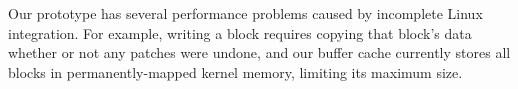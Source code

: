 \documentclass[9pt,twocolumn,letterpaper]{article}
\newcommand{\Kudos}{Featherstitch}
\newcommand{\patch}{patch}
\newcommand{\patchgroup}{patchgroup}
\newcommand{\patchgroups}{patchgroups}
\begin{document}
\begin{comment}
The Linux kernel must be modified in order to
provide support for \patchgroups.  As a kernel module, there is no way to
get notifications about when processes are created, or when they terminate; this
is necessary to clone the \patchgroup\ scope 
from the parent process when the process is created, and to release all
the \patchgroups\ when it terminates. Ordinarily, this sort of state would be kept
as part of the Linux \texttt{task\_struct} (i.e. process) structure, but this is
not a viable option for a dynamically loadable kernel module. Instead, the
\Kudos\ module keeps this state internally and uses new kernel hooks
to be notified when processes fork or exit. 

Our interfaces bypass all Linux caches, because \Kudos\ provides its own
\patch-aware caches (\S\ref{sec:modules:wbcache}) in order to provide its
write-ordering guarantees.

Our current implementation uses Linux's queuing structures for queuing I/O
requests for block devices. Although this is working, there are a couple subtle
problems that we would like to solve in a future version. For instance, we would
like to be able to give more priority to read requests, potentially even
reserving a SCSI TCQ or SATA NCQ command tag for reads only. In the current
implementation, read delay increases noticeably when there are many writes; we
suspect that a factor in this behavior is that the command tags are typically
all used for outstanding writes (since we request that the commands complete
only after the physical media has been written), while the Linux queues are
designed for a different situation: writes complete quickly (to the disk's
cache) and only reads take a long time.
\end{comment}

Our prototype has several performance problems caused by incomplete Linux
integration.
%
For example, writing a block requires copying that block's data
whether or not any patches were undone, and
%
our buffer cache currently
stores all blocks in permanently-mapped kernel memory,
limiting its maximum size.


\begin{comment}
We also observe that read delay increases notably when there are many
writes.
%
We suspect that write requests, which for \Kudos\ take far longer than
Linux expects because the drive must delay completion notification, are
using all available command slots; one or more slots should probably be
reserved for reads.
\end{comment}
\end{document}
